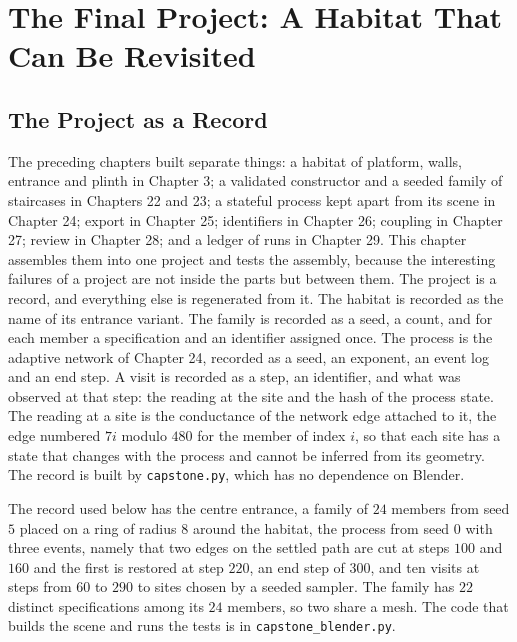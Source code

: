 \chapter{The Final Project: A Habitat That Can Be Revisited}

\section{The Project as a Record}

The preceding chapters built separate things: a habitat of platform, walls, entrance and plinth in Chapter 3; a validated constructor and a seeded family of staircases in Chapters 22 and 23; a stateful process kept apart from its scene in Chapter 24; export in Chapter 25; identifiers in Chapter 26; coupling in Chapter 27; review in Chapter 28; and a ledger of runs in Chapter 29. This chapter assembles them into one project and tests the assembly, because the interesting failures of a project are not inside the parts but between them. The project is a record, and everything else is regenerated from it. The habitat is recorded as the name of its entrance variant. The family is recorded as a seed, a count, and for each member a specification and an identifier assigned once. The process is the adaptive network of Chapter 24, recorded as a seed, an exponent, an event log and an end step. A visit is recorded as a step, an identifier, and what was observed at that step: the reading at the site and the hash of the process state. The reading at a site is the conductance of the network edge attached to it, the edge numbered $7i$ modulo $480$ for the member of index $i$, so that each site has a state that changes with the process and cannot be inferred from its geometry. The record is built by \texttt{capstone.py}, which has no dependence on Blender.



The record used below has the centre entrance, a family of $24$ members from seed $5$ placed on a ring of radius $8$ around the habitat, the process from seed $0$ with three events, namely that two edges on the settled path are cut at steps $100$ and $160$ and the first is restored at step $220$, an end step of $300$, and ten visits at steps from $60$ to $290$ to sites chosen by a seeded sampler. The family has $22$ distinct specifications among its $24$ members, so two share a mesh. The code that builds the scene and runs the tests is in \texttt{capstone\_blender.py}.

